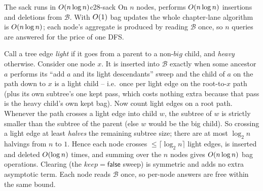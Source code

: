 \begin{theorem}{The sack runs in \(O(n\log n)\)}{c28-sack}
On \(n\) nodes,  performs \(O(n\log n)\) insertions and
deletions from \(\mathcal{B}\).  With \(O(1)\) bag updates the whole
chapter-lane algorithm is \(O(n\log n)\); each node's aggregate is produced
by reading \(\mathcal{B}\) once, so \(n\) queries are answered for the price of
one DFS.
\end{theorem}
\begin{proofbox}
Call a tree edge \emph{light} if it goes from a parent to a non-\(\mathit{big}\)
child, and \emph{heavy} otherwise.  Consider one node \(x\).  It is inserted
into \(\mathcal{B}\) exactly when some ancestor \(a\) performs its ``add \(a\)
and its light descendants'' sweep and the child of \(a\) on the path down to
\(x\) is a light child -- i.e.\ once per light edge on the root-to-\(x\) path
(plus its own subtree's one kept pass, which costs nothing extra because that
pass is the heavy child's own kept bag).  Now count light edges on a root path.
Whenever the path crosses a light edge into child \(w\), the subtree of \(w\) is
strictly smaller than the subtree of the parent (else \(w\) would be the big
child).  So crossing a light edge at least \emph{halves} the remaining subtree
size; there are at most \(\log_2 n\) halvings from \(n\) to \(1\).  Hence each
node crosses \(\le\lceil\log_2 n\rceil\) light edges, is inserted and deleted
\(O(\log n)\) times, and summing over the \(n\) nodes gives
\(O(n\log n)\) bag operations.  Clearing (the \(\mathit{keep}=\mathsf{false}\)
sweep) is symmetric and adds no extra asymptotic term.  Each node reads
\(\mathcal{B}\) once, so per-node answers are free within the same bound.
\end{proofbox}

